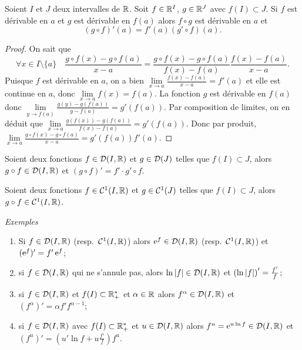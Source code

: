 \begin{theo}
  Soient \(I\) et \(J\) deux intervalles de \(\mathbb{R}\). Soit \(f \in \mathbb{R}^I\), \(g \in 
  \mathbb{R}^J\) avec \(f(I) \subset J\). Si \(f\) est dérivable en \(a\) et \(g\) est 
  dérivable en \(f(a)\) alors \(f \circ g\) est dérivable en \(a\) et
  \begin{equation}
    (g \circ f)'(a)=f'(a) (g' \circ f)(a).
  \end{equation}
\end{theo}
\begin{proof}
  On sait que
  \begin{equation}
    \forall x \in I\setminus\{a\} \quad \frac{g \circ f(x) -g \circ f(a)}{x-a} = 
    \frac{g \circ f(x) -g \circ f(a)}{f(x)-f(a)} \frac{f(x)-f(a)}{x-a}.
  \end{equation}
  Puisque \(f\) est dérivable en \(a\), on a bien \(\lim\limits_{x \to a} 
  \frac{f(x)-f(a)}{x-a} = f'(a)\) et elle est continue en \(a\), donc 
  \(\lim\limits_{x \to a} f(x)=f(a)\). La fonction \(g\) est dérivable en 
  \(f(a)\) donc \(\lim\limits_{y \to f(a)} \frac{g(y)-g(f(a))}{y-f(a)} = 
  g'(f(a))\). Par composition de limites, on en déduit que \(\lim\limits_{x \to 
  a} \frac{g(f(x))-g(f(a))}{f(x)-f(a)} = g'(f(a))\). Donc par produit, 
  \(\lim\limits_{x \to a} \frac{g \circ f(x) -g \circ f(a)}{x-a} = g'(f(a)) 
  f'(a)\).
\end{proof}
\begin{corth}
  Soient deux fonctions \(f \in \mathcal{D}(I,\mathbb{R})\) et \(g \in \mathcal{D}(J)\) telles que 
  \(f(I) \subset J\), alors \(g \circ f \in \mathcal{D}(I,\mathbb{R})\) et \((g\circ f)'=f' 
  \cdot g' \circ f\).
\end{corth}
\begin{corth}
  Soient deux fonctions \(f \in \mathcal{C}^{1}(I,\mathbb{R})\) et \(g \in \mathcal{C}^{1}(J)\) 
  telles que \(f(I) \subset J\), alors \(g \circ f \in \mathcal{C}^{1}(I,\mathbb{R})\).
\end{corth}

\emph{Exemples}

\begin{enumerate}
  \item Si \(f \in \mathcal{D}(I,\mathbb{R})\) (resp.\ \(\mathcal{C}^{1}(I,\mathbb{R})\)) alors \(\operatorname{e}^f 
    \in \mathcal{D}(I,\mathbb{R})\) (resp.\ \(\mathcal{C}^{1}(I,\mathbb{R})\)) et \((\operatorname{e}^f)'=f' \operatorname{e}^f\);
  \item si \(f \in \mathcal{D}(I,\mathbb{R})\) qui ne s'annule pas, alors \(\ln \left\lvert f\right\rvert \in 
    \mathcal{D}(I,\mathbb{R})\) et \(\left(\ln\left\lvert f\right\rvert \right)'=\frac{f'}{f}\);
  \item si \(f \in \mathcal{D}(I,\mathbb{R})\) et \(f(I) \subset \mathbb{R}_{+}^{*}\) et \(\alpha 
    \in \mathbb{R}\) alors \(f^\alpha \in \mathcal{D}(I,\mathbb{R})\) et \((f^\alpha)'=\alpha f' 
    f^{\alpha-1}\);
  \item si \(f \in \mathcal{D}(I,\mathbb{R})\) avec \(f(I) \subset \mathbb{R}_{+}^{*}\) et \(u \in 
    \mathcal{D}(I,\mathbb{R})\) alors \(f^u=\operatorname{e}^{u \ln f} \in \mathcal{D}(I,\mathbb{R})\) et 
    \((f^u)'=\left(u'\ln f+u \frac{f'}{f}\right) f^u\).
\end{enumerate}

